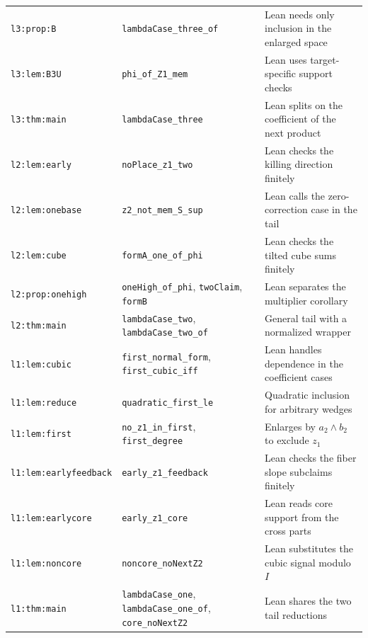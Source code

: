 \documentclass[11pt,a4paper]{article}
\theoremstyle{plain}
\theoremstyle{remark}
\theoremstyle{plain}
\begin{document}
{\begin{longtable}{@{}>{\raggedright\arraybackslash}p{.21\linewidth}
>{\raggedright\arraybackslash}p{.42\linewidth}
>{\raggedright\arraybackslash}p{.31\linewidth}@{}}
\nolinkurl{l3:prop:B} & \nolinkurl{lambdaCase_three_of} & Lean needs only inclusion in the enlarged space \\
\nolinkurl{l3:lem:B3U} & \nolinkurl{phi_of_Z1_mem} & Lean uses target-specific support checks \\
\nolinkurl{l3:thm:main} & \nolinkurl{lambdaCase_three} & Lean splits on the coefficient of the next product \\
\nolinkurl{l2:lem:early} & \nolinkurl{noPlace_z1_two} & Lean checks the killing direction finitely \\
\nolinkurl{l2:lem:onebase} & \nolinkurl{z2_not_mem_S_sup} & Lean calls the zero-correction case in the tail \\
\nolinkurl{l2:lem:cube} & \nolinkurl{formA_one_of_phi} & Lean checks the tilted cube sums finitely \\
\nolinkurl{l2:prop:onehigh} & \nolinkurl{oneHigh_of_phi}, \nolinkurl{twoClaim}, \nolinkurl{formB} & Lean separates the multiplier corollary \\
\nolinkurl{l2:thm:main} & \nolinkurl{lambdaCase_two}, \nolinkurl{lambdaCase_two_of} & General tail with a normalized wrapper \\
\nolinkurl{l1:lem:cubic} & \nolinkurl{first_normal_form}, \nolinkurl{first_cubic_iff} & Lean handles dependence in the coefficient cases \\
\nolinkurl{l1:lem:reduce} & \nolinkurl{quadratic_first_le} & Quadratic inclusion for arbitrary wedges \\
\nolinkurl{l1:lem:first} & \nolinkurl{no_z1_in_first}, \nolinkurl{first_degree} & Enlarges by $a_2\wedge b_2$ to exclude $z_1$ \\
\nolinkurl{l1:lem:earlyfeedback} & \nolinkurl{early_z1_feedback} & Lean checks the fiber slope subclaims finitely \\
\nolinkurl{l1:lem:earlycore} & \nolinkurl{early_z1_core} & Lean reads core support from the cross parts \\
\nolinkurl{l1:lem:noncore} & \nolinkurl{noncore_noNextZ2} & Lean substitutes the cubic signal modulo $I$ \\
\nolinkurl{l1:thm:main} & \nolinkurl{lambdaCase_one}, \nolinkurl{lambdaCase_one_of}, \nolinkurl{core_noNextZ2} & Lean shares the two tail reductions \\
\end{longtable}}
\end{document}
